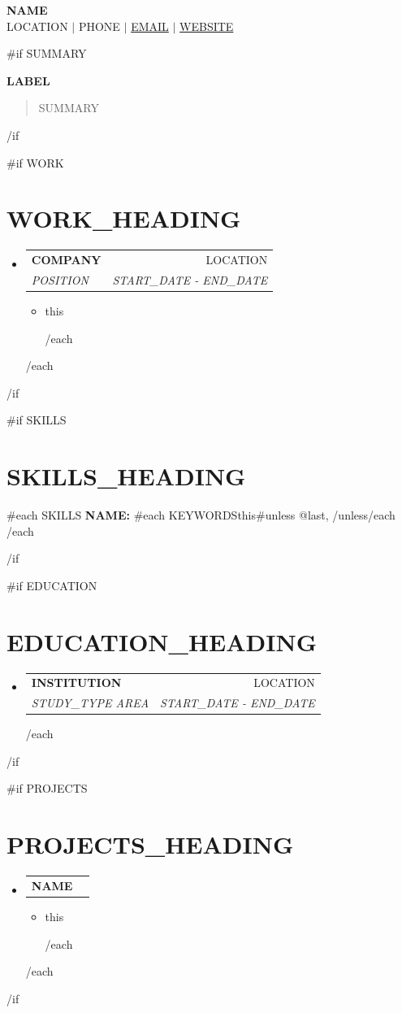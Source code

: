 \documentclass[letterpaper,11pt]{article}
\makeatletter
\newcommand{\resumeItem}[1]{
  \item\small{
    {#1 \vspace{-2pt}}
  }
}
\newcommand{\resumeSubheading}[4]{
  \vspace{-2pt}\item
    \begin{tabular*}{0.97\textwidth}[t]{l@{\extracolsep{\fill}}r}
      \textbf{#1} & #2 \\
      \textit{\small#3} & \textit{\small #4} \\
    \end{tabular*}\vspace{-7pt}
}
\newcommand{\resumeProjectHeading}[2]{
    \item
    \begin{tabular*}{0.97\textwidth}{l@{\extracolsep{\fill}}r}
      \small#1 & #2 \\
    \end{tabular*}\vspace{-7pt}
}
\newcommand{\resumeSubHeadingListStart}{\begin{itemize}[leftmargin=0.15in, label={}]}
\newcommand{\resumeSubHeadingListEnd}{\end{itemize}}
\newcommand{\resumeItemListStart}{\begin{itemize}}
\newcommand{\resumeItemListEnd}{\end{itemize}\vspace{-5pt}}
\makeatother
\begin{document}
\begin{center}
    \textbf{\Huge \scshape {{NAME}}} \\ \vspace{1pt}
    \small {{LOCATION}} $|$ {{PHONE}} $|$ \href{mailto:{{EMAIL}}}{{{EMAIL}}} $|$
    \href{https://{{WEBSITE}}}{{{WEBSITE}}}
\end{center}

{{#if SUMMARY}}
\vspace{-10pt}
\begin{center}
    \textbf{\large {{LABEL}}}
\end{center}
\vspace{-5pt}
\begin{quote}
\centering
\small{{SUMMARY}}
\end{quote}
{{/if}}

{{#if WORK}}
\section{{{WORK_HEADING}}}
  \resumeSubHeadingListStart
{{#each WORK}}
    \resumeSubheading
      { {{COMPANY}} }{ {{LOCATION}} }
      { {{POSITION}} }{ {{START_DATE}} - {{END_DATE}} }
      \resumeItemListStart
{{#each HIGHLIGHTS}}
        \resumeItem{ {{this}} }
{{/each}}
      \resumeItemListEnd
{{/each}}
  \resumeSubHeadingListEnd
{{/if}}

{{#if SKILLS}}
\section{{{SKILLS_HEADING}}}
 \begin{itemize}[leftmargin=0.15in, label={}]
    \small{\item{
{{#each SKILLS}}
     \textbf{ {{NAME}}: }{{#each KEYWORDS}}{{this}}{{#unless @last}}, {{/unless}}{{/each}} \\
{{/each}}
    }}
 \end{itemize}
{{/if}}

{{#if EDUCATION}}
\section{{{EDUCATION_HEADING}}}
  \resumeSubHeadingListStart
{{#each EDUCATION}}
    \resumeSubheading
      { {{INSTITUTION}} }{ {{LOCATION}} }
      { {{STUDY_TYPE}} {{AREA}} }{ {{START_DATE}} - {{END_DATE}} }
{{/each}}
  \resumeSubHeadingListEnd
{{/if}}

{{#if PROJECTS}}
\section{{{PROJECTS_HEADING}}}
    \resumeSubHeadingListStart
{{#each PROJECTS}}
      \resumeProjectHeading
          {\textbf{ {{NAME}} }}{}
          \resumeItemListStart
{{#each HIGHLIGHTS}}
            \resumeItem{ {{this}} }
{{/each}}
          \resumeItemListEnd
{{/each}}
    \resumeSubHeadingListEnd
{{/if}}
\end{document}
